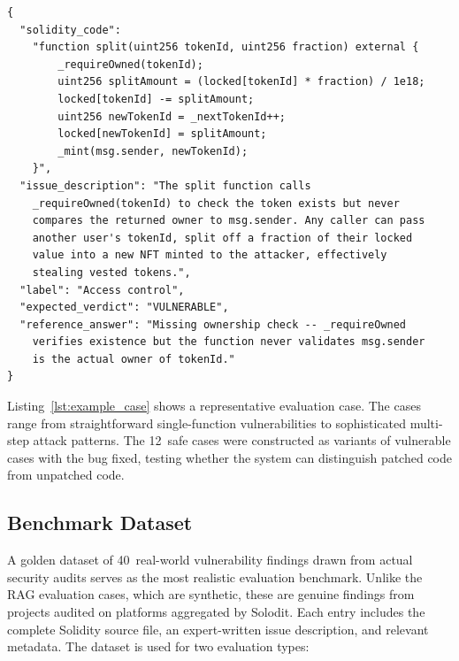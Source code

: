 \begin{listing}[!ht]
\begin{verbatim}
{
  "solidity_code":
    "function split(uint256 tokenId, uint256 fraction) external {
        _requireOwned(tokenId);
        uint256 splitAmount = (locked[tokenId] * fraction) / 1e18;
        locked[tokenId] -= splitAmount;
        uint256 newTokenId = _nextTokenId++;
        locked[newTokenId] = splitAmount;
        _mint(msg.sender, newTokenId);
    }",
  "issue_description": "The split function calls
    _requireOwned(tokenId) to check the token exists but never
    compares the returned owner to msg.sender. Any caller can pass
    another user's tokenId, split off a fraction of their locked
    value into a new NFT minted to the attacker, effectively
    stealing vested tokens.",
  "label": "Access control",
  "expected_verdict": "VULNERABLE",
  "reference_answer": "Missing ownership check -- _requireOwned
    verifies existence but the function never validates msg.sender
    is the actual owner of tokenId."
}
\end{verbatim}
\caption[The evaluation case.]{The evaluation case for an access control vulnerability in a token splitting function.}
\label{lst:example_case}
\end{listing}

Listing~\ref{lst:example_case} shows a representative evaluation case. The cases range from straightforward single-function vulnerabilities to sophisticated multi-step attack patterns. The 12~safe cases were constructed as variants of vulnerable cases with the bug fixed, testing whether the system can distinguish patched code from unpatched code.

\subsection{Benchmark Dataset}
\label{subsec:benchmark-dataset}

A golden dataset of 40~real-world vulnerability findings drawn from actual security audits serves as the most realistic evaluation benchmark. Unlike the RAG evaluation cases, which are synthetic, these are genuine findings from projects audited on platforms aggregated by Solodit. Each entry includes the complete Solidity source file, an expert-written issue description, and relevant metadata. The dataset is used for two evaluation types:


